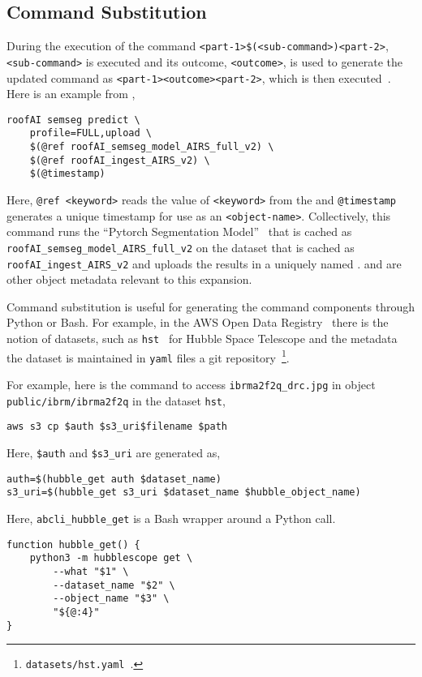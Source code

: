 \subsection{Command Substitution}\label{command_substitution}

During the execution of the command \texttt{<part-1>\$(<sub-command>)<part-2>}, \texttt{<sub-command>} is executed and its outcome, \texttt{<outcome>}, is used to generate the updated command as \texttt{<part-1><outcome><part-2>}, which is then executed~\cite{command_substitution}. Here is an example from ,
%
\begin{verbatim}
roofAI semseg predict \
    profile=FULL,upload \
    $(@ref roofAI_semseg_model_AIRS_full_v2) \
    $(@ref roofAI_ingest_AIRS_v2) \
    $(@timestamp)
\end{verbatim}
%
Here, \texttt{@ref <keyword>} reads the value of \texttt{<keyword>} from the  and \texttt{@timestamp} generates a unique timestamp for use as an \texttt{<object-name>}. Collectively, this command runs the \enquote{Pytorch Segmentation Model}~\cite{smp} that is cached as \texttt{roofAI\_semseg\_model\_AIRS\_full\_v2} on the dataset that is cached as \texttt{roofAI\_ingest\_AIRS\_v2} and uploads the results in a uniquely named .  and  are other object metadata relevant to this expansion.

Command substitution is useful for generating the command components through Python or Bash. For example, in the AWS Open Data Registry~\cite{aws_open_data} there is the notion of datasets, such as \texttt{hst}~\cite{hst} for Hubble Space Telescope and the metadata the dataset is maintained in \texttt{yaml} files a git repository~\footnote{\texttt{datasets/hst.yaml}~\cite{aws_open_data}.}. 

For example, here is the command to access \texttt{ibrma2f2q\_drc.jpg} in object \texttt{public/ibrm/ibrma2f2q} in the dataset \texttt{hst},
%
\begin{verbatim}
aws s3 cp $auth $s3_uri$filename $path
\end{verbatim}
%
Here, \texttt{\$auth} and \texttt{\$s3\_uri} are generated as,
%
\begin{verbatim}
auth=$(hubble_get auth $dataset_name)
s3_uri=$(hubble_get s3_uri $dataset_name $hubble_object_name)
\end{verbatim}
%
Here, \texttt{abcli\_hubble\_get} is a Bash wrapper around a Python call.
%
\begin{verbatim}
function hubble_get() {
    python3 -m hubblescope get \
        --what "$1" \
        --dataset_name "$2" \
        --object_name "$3" \
        "${@:4}"
}
\end{verbatim}





